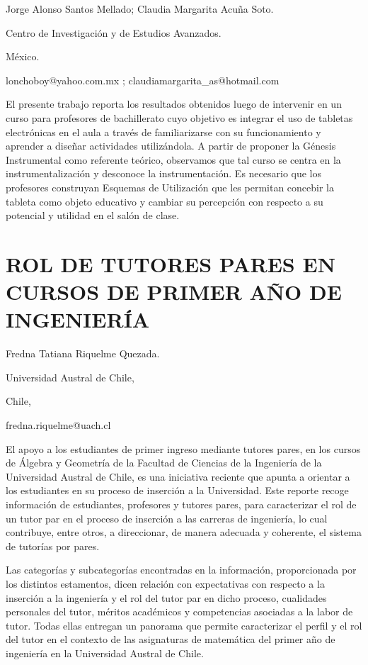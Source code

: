 \begin{datos}

Jorge Alonso Santos Mellado; Claudia Margarita Acuña Soto.

Centro de Investigación y de Estudios Avanzados. 

México. 

lonchoboy@yahoo.com.mx ; claudiamargarita\_as@hotmail.com

\end{datos}

El presente trabajo reporta los resultados obtenidos luego de intervenir
en un curso para profesores de bachillerato cuyo objetivo es integrar
el uso de tabletas electrónicas en el aula a través de familiarizarse
con su funcionamiento y aprender a diseñar actividades utilizándola.
A partir de proponer la Génesis Instrumental como referente teórico,
observamos que tal curso se centra en la instrumentalización y desconoce
la instrumentación. Es necesario que los profesores construyan Esquemas
de Utilización que les permitan concebir la tableta como objeto educativo
y cambiar su percepción con respecto a su potencial y utilidad en
el salón de clase. 


\section{ROL DE TUTORES PARES EN CURSOS DE PRIMER AÑO DE INGENIERÍA }

\begin{datos}

Fredna Tatiana Riquelme Quezada.

Universidad Austral de Chile, 

Chile,

fredna.riquelme@uach.cl 

\end{datos}

El apoyo a los estudiantes de primer ingreso mediante tutores pares,
en los cursos de Álgebra y Geometría de la Facultad de Ciencias de
la Ingeniería de la Universidad Austral de Chile, es una iniciativa
reciente que apunta a orientar a los estudiantes en su proceso de
inserción a la Universidad. Este reporte recoge información de estudiantes,
profesores y tutores pares, para caracterizar el rol de un tutor par
en el proceso de inserción a las carreras de ingeniería, lo cual contribuye,
entre otros, a direccionar, de manera adecuada y coherente, el sistema
de tutorías por pares. 

Las categorías y subcategorías encontradas en la información, proporcionada
por los distintos estamentos, dicen relación con expectativas con
respecto a la inserción a la ingeniería y el rol del tutor par en
dicho proceso, cualidades personales del tutor, méritos académicos
y competencias asociadas a la labor de tutor. Todas ellas entregan
un panorama que permite caracterizar el perfil y el rol del tutor
en el contexto de las asignaturas de matemática del primer año de
ingeniería en la Universidad Austral de Chile.


